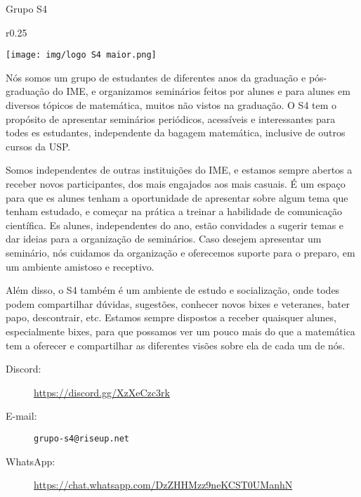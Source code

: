 \begin{subsecao}{Grupo S4}

\begin{wrapfigure}{r}{0.25\textwidth}
    \vspace{-25pt}
    \begin{center}
      \texttt{[image: img/logo S4 maior.png]}
    \end{center}
    \vspace{-25pt}
  \end{wrapfigure}


Nós somos um grupo de estudantes de diferentes anos da graduação e pós-graduação 
do IME, e organizamos seminários feitos por alunes e para alunes em diversos
tópicos de matemática, muitos não vistos na graduação. O S4 tem o propósito de apresentar seminários 
periódicos, acessíveis e interessantes para todes es estudantes, independente da bagagem 
matemática, inclusive de outros cursos da USP. 

Somos independentes de outras instituições do IME, e estamos sempre abertos a 
receber novos participantes, dos mais engajados aos mais casuais. É um espaço
para que es alunes tenham a oportunidade de apresentar sobre algum tema que tenham
estudado, e começar na prática a treinar a habilidade de comunicação científica. 
Es alunes, independentes do ano, estão convidades a sugerir temas e dar ideias
para a organização de seminários. Caso desejem apresentar um seminário, nós
cuidamos da organização e oferecemos suporte para o preparo, em um ambiente amistoso e receptivo.

Além disso, o S4 também é um ambiente de estudo e socialização, onde todes podem
compartilhar dúvidas, sugestões, conhecer novos bixes e veteranes, bater papo,
descontrair, etc. Estamos sempre dispostos a receber quaisquer alunes, especialmente
bixes, para que possamos ver um pouco mais do que a matemática tem a oferecer e
compartilhar as diferentes visões sobre ela de cada um de nós.

\begin{description}
  \item[Discord:] \url{https://discord.gg/XzXeCzc3rk}
  \item[E-mail:] {\tt grupo-s4@riseup.net}
  \item[WhatsApp:] \url{https://chat.whatsapp.com/DzZHHMzz9neKCST0UManhN}
\end{description}

\end{subsecao}
